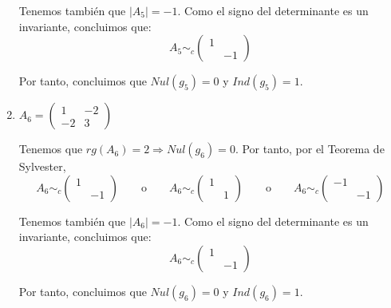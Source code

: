 \begin{ejercicio}
\begin{enumerate}
        Tenemos también que $|A_5| = -1$. Como el signo del determinante es un invariante, concluimos que:
        \begin{equation*}
            A_5 \sim_c \left(\begin{array}{cc}
                1 &  \\
                & -1
            \end{array} \right)
        \end{equation*}
        
        Por tanto, concluimos que $Nul(g_5)=0$ y $Ind(g_5)=1$.

        \item $A_6=\left(\begin{array}{cc}
            1 & -2 \\
            -2 & 3
        \end{array} \right)$
        
        Tenemos que $rg(A_6) = 2 \Longrightarrow Nul(g_6)=0$. Por tanto, por el Teorema de Sylvester,
        \begin{equation*}
            A_6 \sim_c \left(\begin{array}{cc}
                1 &  \\
                & -1
            \end{array} \right)
            \qquad \text{o} \qquad
            A_6 \sim_c \left(\begin{array}{cc}
                1 &  \\
                & 1
            \end{array} \right)
            \qquad \text{o} \qquad
            A_6 \sim_c \left(\begin{array}{cc}
                -1 &  \\
                & -1
            \end{array} \right)
        \end{equation*}

        Tenemos también que $|A_6| = -1$. Como el signo del determinante es un invariante, concluimos que:
        \begin{equation*}
            A_6 \sim_c \left(\begin{array}{cc}
                1 &  \\
                & -1
            \end{array} \right)
        \end{equation*}
        
        Por tanto, concluimos que $Nul(g_6)=0$ y $Ind(g_6)=1$.


\end{enumerate}
\end{ejercicio}
